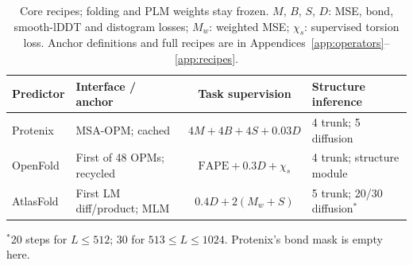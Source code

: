 \begin{table}[t]
\caption{Core recipes; folding and PLM weights stay frozen.
$M$, $B$, $S$, $D$: MSE, bond, smooth-lDDT and distogram losses;
$M_w$: weighted MSE; $\chi_s$: supervised torsion loss.
Anchor definitions and full recipes are in Appendices~\ref{app:operators}--\ref{app:recipes}.}
\label{tab:recipes}
\centering\footnotesize\setlength{\tabcolsep}{4pt}
\begin{tabular}{@{}llcl@{}}
\toprule
Predictor & Interface / anchor & Task supervision & Structure inference \\
\midrule
Protenix & MSA-OPM; cached & $4M+4B+4S+0.03D$ & 4 trunk; 5 diffusion \\
OpenFold & First of 48 OPMs; recycled & $\mathrm{FAPE}+0.3D+\chi_s$ & 4 trunk; structure module \\
AtlasFold & First LM diff/product; MLM & $0.4D+2(M_w+S)$ & 5 trunk; 20/30 diffusion$^*$ \\
\bottomrule
\end{tabular}
\par\smallskip\footnotesize $^*$20 steps for $L\le512$; 30 for $513\le L\le1024$.
Protenix's bond mask is empty here.
\end{table}
